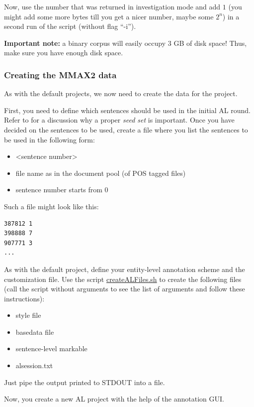 \documentclass[DIV12,english,11pt,halfparskip]{scrartcl}
\begin{document}
\begin{appendix}
Now, use the number that was returned in investigation mode and add
$1$ (you might add some more bytes till you get a nicer number, maybe
some $2^n$) in a second run of the script (without flag ``-i'').

\textbf{Important note:} a binary corpus will easily occupy 3 GB of
disk space! Thus, make sure you have enough disk space.


\subsubsection{Creating the MMAX2 data}

As with the default projects, we now need to create the data for the
project.

First, you need to define which sentences should be used in the
initial AL round. Refer to \cite{Tomanek2007law} for a discussion why
a proper \emph{seed set} is important. Once you have decided on the
sentences to be used, create a file where you list the sentences to be
used in the following form:

\begin{itemize}
\item <file name> <sentence number>
\item file name as in the document pool (of POS tagged files)
\item sentence number starts from 0
\end{itemize}

Such a file might look like this:
\begin{verbatim}
387812 1
398888 7
907771 3
...
\end{verbatim}

As with the default project, define your entity-level annotation
scheme and the customization file. Use the script
\url{createALFiles.sh} to create the following files (call the script
without arguments to see the list of arguments and follow these
instructions):
\begin{itemize}
\item style file
\item basedata file
\item sentence-level markable
\item alsession.txt
\end{itemize}

Just pipe the output printed to STDOUT into a file.

Now, you create a new AL project with the help of the annotation GUI.


\end{appendix}


%

\end{document}
